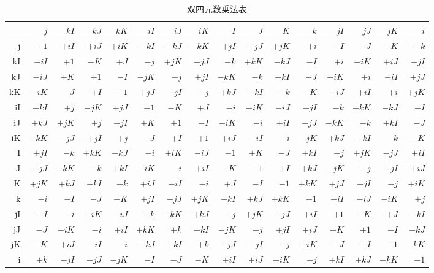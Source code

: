 \documentclass[dvipdfmx,a4paper]{jsbook}
\theoremstyle{definition}
\theoremstyle{remark}
\begin{document}
\begin{table}[ht]
  \begin{center}
    \caption{双四元数乗法表}
    \scriptsize
    \begin{tabular}{r|rrrrrrrrrrrrrrr}
      &$j$&$kI$&$kJ$&$kK$&$iI$&$iJ$&$iK$&$I$&$J$&$K$&$k$&$jI$&$jJ$&$jK$&$i$ \\ \hline
      j&$-1$&$+iI$&$+iJ$&$+iK$&$-kI$&$-kJ$&$-kK$&$+jI$&$+jJ$&$+jK$&$+i$&$-I$&$-J$&$-K$&$-k$ \\ \hline
      kI&$-iI$&$+1$&$-K$&$+J$&$-j$&$+jK$&$-jJ$&$-k$&$+kK$&$-kJ$&$-I$&$+i$&$-iK$&$+iJ$&$+jI$ \\ \hline
      kJ&$-iJ$&$+K$&$+1$&$-I$&$-jK$&$-j$&$+jI$&$-kK$&$-k$&$+kI$&$-J$&$+iK$&$+i$&$-iI$&$+jJ$ \\ \hline
      kK&$-iK$&$-J$&$+I$&$+1$&$+jJ$&$-jI$&$-j$&$+kJ$&$-kI$&$-k$&$-K$&$-iJ$&$+iI$&$+i$&$+jK$ \\ \hline
      iI&$+kI$&$+j$&$-jK$&$+jJ$&$+1$&$-K$&$+J$&$-i$&$+iK$&$-iJ$&$-jI$&$-k$&$+kK$&$-kJ$&$-I$ \\ \hline
      iJ&$+kJ$&$+jK$&$+j$&$-jI$&$+K$&$+1$&$-I$&$-iK$&$-i$&$+iI$&$-jJ$&$-kK$&$-k$&$+kI$&$-J$ \\ \hline
      iK&$+kK$&$-jJ$&$+jI$&$+j$&$-J$&$+I$&$+1$&$+iJ$&$-iI$&$-i$&$-jK$&$+kJ$&$-kI$&$-k$&$-K$ \\ \hline
      I&$+jI$&$-k$&$+kK$&$-kJ$&$-i$&$+iK$&$-iJ$&$-1$&$+K$&$-J$&$+kI$&$-j$&$+jK$&$-jJ$&$+iI$ \\ \hline
      J&$+jJ$&$-kK$&$-k$&$+kI$&$-iK$&$-i$&$+iI$&$-K$&$-1$&$+I$&$+kJ$&$-jK$&$-j$&$+jI$&$+iJ$ \\ \hline
      K&$+jK$&$+kJ$&$-kI$&$-k$&$+iJ$&$-iI$&$-i$&$+J$&$-I$&$-1$&$+kK$&$+jJ$&$-jI$&$-j$&$+iK$ \\ \hline
      k&$-i$&$-I$&$-J$&$-K$&$+jI$&$+jJ$&$+jK$&$+kI$&$+kJ$&$+kK$&$-1$&$-iI$&$-iJ$&$-iK$&$+j$ \\ \hline
      jI&$-I$&$-i$&$+iK$&$-iJ$&$+k$&$-kK$&$+kJ$&$-j$&$+jK$&$-jJ$&$+iI$&$+1$&$-K$&$+J$&$-kI$ \\ \hline
      jJ&$-J$&$-iK$&$-i$&$+iI$&$+kK$&$+k$&$-kI$&$-jK$&$-j$&$+jI$&$+iJ$&$+K$&$+1$&$-I$&$-kJ$ \\ \hline
      jK&$-K$&$+iJ$&$-iI$&$-i$&$-kJ$&$+kI$&$+k$&$+jJ$&$-jI$&$-j$&$+iK$&$-J$&$+I$&$+1$&$-kK$ \\ \hline
      i&$+k$&$-jI$&$-jJ$&$-jK$&$-I$&$-J$&$-K$&$+iI$&$+iJ$&$+iK$&$-j$&$+kI$&$+kJ$&$+kK$&$-1$ \\ \hline
    \end{tabular}
  \end{center}
\end{table}
\end{document}
